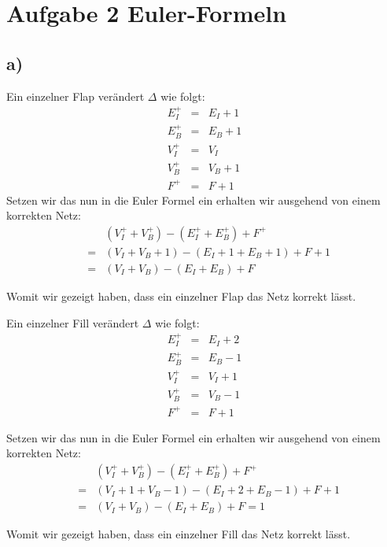 
\section*{Aufgabe 2 Euler-Formeln}

\subsection*{a)}

Ein einzelner Flap verändert $\Delta$ wie folgt:
\begin{eqnarray}
E_{I}^+ &=& E_{I} +1 \\
    E_{B}^+ &=& E_{B} +1 \\
    V_{I}^+ &=& V_{I} \\
    V_{B}^+ &=& V_{B} +1\\
    F^+ &=& F +1
\end{eqnarray}
Setzen wir das nun in die Euler Formel ein erhalten wir ausgehend von einem korrekten Netz:
\begin{eqnarray}
    &&(V_{I}^+ + V_B^+) - (E_I^+ + E_B^+) + F^+\\
    &=& (V_{I} + V_B + 1) - (E_I + 1 + E_B + 1) + F +1 \\
    &=&(V_{I} + V_B ) - (E_I +E_B ) + F 
\end{eqnarray}

Womit wir gezeigt haben, dass ein einzelner Flap das Netz korrekt lässt.

Ein einzelner Fill verändert $\Delta$ wie folgt:
\begin{eqnarray}
E_{I}^+ &=& E_{I} +2 \\
    E_{B}^+ &=& E_{B} -1 \\
    V_{I}^+ &=& V_{I} +1\\
    V_{B}^+ &=& V_{B} -1\\
    F^+ &=& F +1
\end{eqnarray}


Setzen wir das nun in die Euler Formel ein erhalten wir ausgehend von einem korrekten Netz:
\begin{eqnarray}
    &&(V_{I}^+ + V_B^+) - (E_I^+ + E_B^+) + F^+  \\
    &=&(V_{I} +1+ V_B - 1) - (E_I + 2 + E_B - 1) + F +1 \\
    &=& (V_{I} + V_B ) - (E_I +E_B ) + F = 1
\end{eqnarray}


Womit wir gezeigt haben, dass ein einzelner Fill das Netz korrekt lässt.

